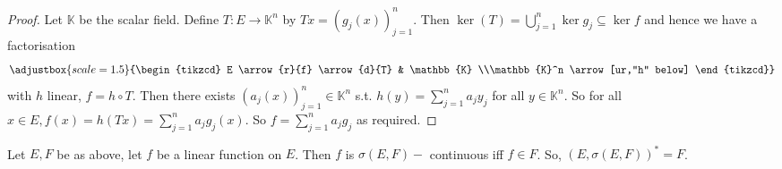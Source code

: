 \documentclass{article}
\begin{document}
\begin{proof}
Let $\mathbb{K}$ be the scalar field. Define $T:E\to\mathbb{K}^n$ by $Tx = (g_j(x))^n_{j=1}$. Then $\ker(T)=\displaystyle\bigcup^n_{j=1}\ker g_j\subseteq\ker f$ and hence we have a factorisation
$$
\adjustbox{scale = 1.5}{\begin{tikzcd}
E \arrow{r}{f} \arrow{d}{T} & \mathbb{K} \\%
\mathbb{K}^n
\arrow[ur,"h" below]
\end{tikzcd}}
$$ 
with $h$ linear, $f=h\circ T$. Then there exists $(a_j(x))^n_{j=1}\in \mathbb{K}^n$ s.t. $h(y) = \displaystyle\sum^n_{j=1}a_jy_j$ for all $y\in\mathbb{K}^n$. So for all $x\in E, f(x) = h(Tx) = \displaystyle\sum^n_{j=1}a_jg_j(x)$. So $f = \displaystyle\sum^n_{j=1}a_jg_j$ as required.
\end{proof}

\begin{boxprop}\label{prop: weak top continuity characterisation}
    Let $E,F $ be as above, let $f$ be a linear function on $E$. Then $f$ is $\sigma(E,F)-$ continuous iff $f\in F$. So, $(E,\sigma(E,F))^*=F$.
\end{boxprop}
\end{document}
